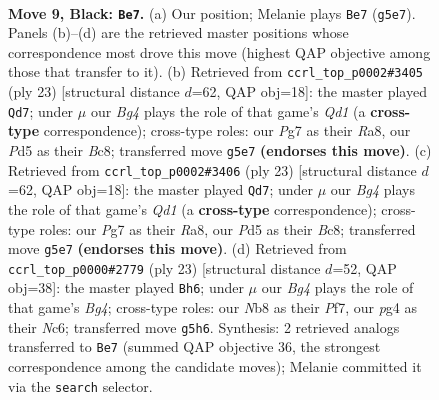 \documentclass[11pt]{article}
\begin{document}
\clearpage

\begin{figure}[p]\centering
\begin{subfigure}{0.46\textwidth}\centering
\resizebox{\linewidth}{!}{%
\newchessgame
\chessboard[
  setfen={rnbqk2r/pp3ppp/2p5/3p2b1/3P1PP1/2N1P3/PP5P/R2QKBNR b KQkq - 0 9},
  showmover=false,
  pgfstyle=straightmove, color=movearrow, markmove={g5-e7}
]}
\caption{}
\end{subfigure}\hfill
\begin{subfigure}{0.46\textwidth}\centering
\resizebox{\linewidth}{!}{%
\newchessgame
\chessboard[
  setfen={r1bqk2r/p4ppp/2N1pb2/2Pp4/3P4/2P5/P4PPP/R1BQK2R b KQkq - 0 12},
  showmover=false,
  pgfstyle=straightmove, color=movearrow, markmove={d8-d7}
]}
\caption{}
\end{subfigure}
\\[4pt]
\begin{subfigure}{0.46\textwidth}\centering
\resizebox{\linewidth}{!}{%
\newchessgame
\chessboard[
  setfen={r1bqk2r/p4ppp/2N1pb2/2Pp4/3P4/2P5/P4PPP/R1BQK2R b KQkq - 0 12},
  showmover=false,
  pgfstyle=straightmove, color=movearrow, markmove={d8-d7}
]}
\caption{}
\end{subfigure}\hfill
\begin{subfigure}{0.46\textwidth}\centering
\resizebox{\linewidth}{!}{%
\newchessgame
\chessboard[
  setfen={r1bqk2r/5ppp/p1np4/1p1Np1b1/4P2P/N1P5/PP3PP1/R2QKB1R b KQkq - 0 12},
  showmover=false,
  pgfstyle=straightmove, color=movearrow, markmove={g5-h6}
]}
\caption{}
\end{subfigure}
\caption{\textbf{Move 9, Black: \texttt{Be7}.} (a) Our position; Melanie plays \texttt{Be7} (\texttt{g5e7}). Panels (b)--(d) are the retrieved master positions whose correspondence most drove this move (highest QAP objective among those that transfer to it). (b) Retrieved from \texttt{ccrl\_top\_p0002\#3405} (ply 23) [structural distance $d$=62, QAP obj=18]: the master played \texttt{Qd7}; under $\mu$ our \emph{Bg4} plays the role of that game's \emph{Qd1} (a \textbf{cross-type} correspondence); cross-type roles: our \emph{P}g7 as their \emph{R}a8, our \emph{P}d5 as their \emph{B}c8; transferred move \texttt{g5e7} \textbf{(endorses this move)}. (c) Retrieved from \texttt{ccrl\_top\_p0002\#3406} (ply 23) [structural distance $d$=62, QAP obj=18]: the master played \texttt{Qd7}; under $\mu$ our \emph{Bg4} plays the role of that game's \emph{Qd1} (a \textbf{cross-type} correspondence); cross-type roles: our \emph{P}g7 as their \emph{R}a8, our \emph{P}d5 as their \emph{B}c8; transferred move \texttt{g5e7} \textbf{(endorses this move)}. (d) Retrieved from \texttt{ccrl\_top\_p0000\#2779} (ply 23) [structural distance $d$=52, QAP obj=38]: the master played \texttt{Bh6}; under $\mu$ our \emph{Bg4} plays the role of that game's \emph{Bg4}; cross-type roles: our \emph{N}b8 as their \emph{P}f7, our \emph{p}g4 as their \emph{N}c6; transferred move \texttt{g5h6}. Synthesis: 2 retrieved analogs transferred to \texttt{Be7} (summed QAP objective 36, the strongest correspondence among the candidate moves); Melanie committed it via the \texttt{search} selector.}
\label{fig:thought-m17}
\end{figure}
\end{document}
